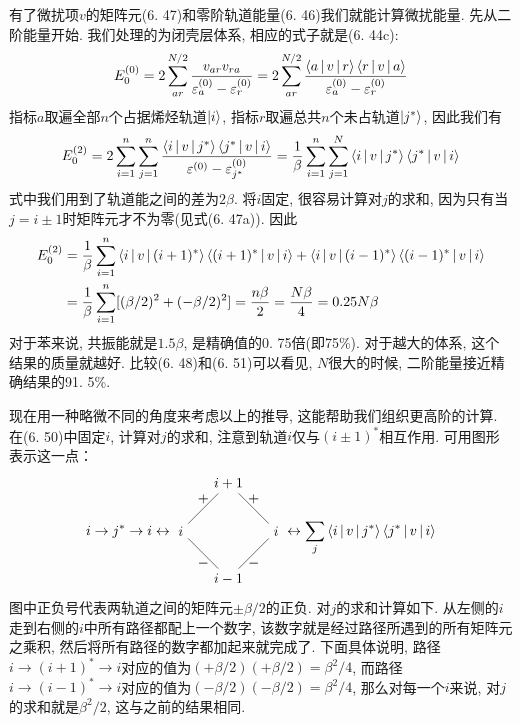 有了微扰项$v$的矩阵元(6.
47)和零阶轨道能量(6.
46)我们就能计算微扰能量. 
先从二阶能量开始. 
我们处理的为闭壳层体系, 
相应的式子就是(6.
44c):
\begin{align}
E_0^{(0)} = 2\sum_{ar}^{N/2}\frac{v_{ar}v_{ra}}{\varepsilon^{(0)}_a - \varepsilon^{(0)}_r} = 2 \sum_{ar}^{N/2}\frac{\Braket{a|v|r}\Braket{r|v|a}}{\varepsilon^{(0)}_a - \varepsilon^{(0)}_r}
\end{align}
指标$a$取遍全部$n$个占据烯烃轨道$\Ket{i}$, 
指标$r$取遍总共$n$个未占轨道$\Ket{j^*}$, 
因此我们有
\begin{align}
E_0^{(2)} = 2\sum_{i=1}^{n}\sum_{j=1}^{n}\frac{\Braket{i|v|j^*}\Braket{j^*|v|i}}{\varepsilon^{(0)}-\varepsilon^{(0)}_{j^*}} = \frac{1}{\beta}\sum_{i=1}^{n}\sum_{j=1}^{N}\Braket{i|v|j^*}\Braket{j^*|v|i}
\end{align}
式中我们用到了轨道能之间的差为$2\beta$. 
将$i$固定, 
很容易计算对$j$的求和, 
因为只有当$j=i\pm1$时矩阵元才不为零(见式(6.
47a)). 
因此
\begin{align}
E_0^{(2)} & = \frac{1}{\beta}\sum_{i=1}^{n}\Braket{i|v|(i+1)^*}\Braket{(i+1)^*|v|i} + \Braket{i|v|(i-1)^*}\Braket{(i-1)^*|v|i}\notag\\
& = \frac{1}{\beta}\sum_{i=1}^{n}[(\beta/2)^2 + (-\beta/2)^2] = \frac{n\beta}{2} = \frac{N\beta}{4} = 0.25N\beta
\end{align}
对于苯来说, 
共振能就是$1.5\beta$, 
 是精确值的0.
75倍(即75\%). 
对于越大的体系, 
这个结果的质量就越好. 
比较(6.
48)和(6.
51)可以看见, 
$N$很大的时候, 
二阶能量接近精确结果的91.
5\%.


现在用一种略微不同的角度来考虑以上的推导, 
这能帮助我们组织更高阶的计算. 
在(6.
50)中固定$i$, 
计算对$j$的求和, 
注意到轨道$i$仅与$(i\pm1)^*$相互作用. 
可用图形表示这一点：
\begin{equation*}
i\to j^* \to i\leftrightarrow
\begin{tikzpicture}[baseline={(0,-.1)},scale=1.2]
\node(a)at (0,0){$i$};\node(b)at(1,1){$i+1$};\node(c)at(2,0){$i$};\node(d)at(1,-1){$i-1$};
\draw (a)--node[above]{$+$}(b)--node[above]{$+$}(c)--node[below]{$-$}(d)--node[below]{$-$}(a);
\end{tikzpicture}\leftrightarrow \sum_j\braket{i|v|j^*}\braket{j^*|v|i}
\end{equation*}
图中正负号代表两轨道之间的矩阵元$\pm\beta/2$的正负. 
对$j$的求和计算如下. 
从左侧的$i$走到右侧的$i$中所有路径都配上一个数字, 
该数字就是经过路径所遇到的所有矩阵元之乘积, 
然后将所有路径的数字都加起来就完成了. 
下面具体说明, 
路径$i\to (i+1)^*\to i$对应的值为$(+\beta/2)(+\beta/2)=\beta^2/4$, 
而路径$i\to (i-1)^*\to i$对应的值为$(-\beta/2)(-\beta/2)=\beta^2/4$, 
那么对每一个$i$来说, 
对$j$的求和就是$\beta^2/2$, 
这与之前的结果相同.


